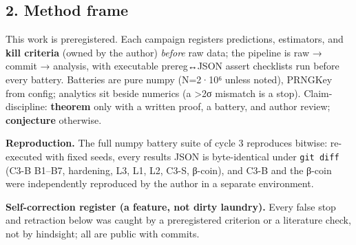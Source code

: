 \documentclass[
  11pt]{article}
\begin{document}
\subsection{2. Method frame}\label{method-frame}

This work is preregistered. Each campaign registers predictions,
estimators, and \textbf{kill criteria} (owned by the author)
\emph{before} raw data; the pipeline is raw → commit → analysis, with
executable prereg↔JSON assert checklists run before every battery.
Batteries are pure numpy (N=2·10⁶ unless noted), PRNGKey from config;
analytics sit beside numerics (a \textgreater2σ mismatch is a stop).
Claim-discipline: \textbf{theorem} only with a written proof, a battery,
and author review; \textbf{conjecture} otherwise.

\textbf{Reproduction.} The full numpy battery suite of cycle 3
reproduces bitwise: re-executed with fixed seeds, every results JSON is
byte-identical under \texttt{git\ diff} (C3-B B1--B7, hardening, L3, L1,
L2, C3-S, β-coin), and C3-B and the β-coin were independently reproduced
by the author in a separate environment.

\textbf{Self-correction register (a feature, not dirty laundry).} Every
false stop and retraction below was caught by a preregistered criterion
or a literature check, not by hindsight; all are public with commits.
\end{document}
